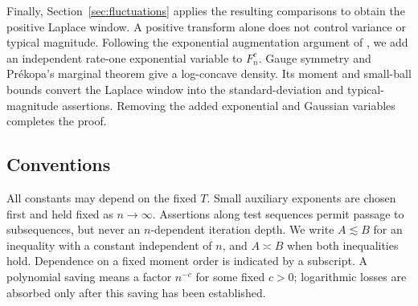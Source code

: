 Finally, Section~\ref{sec:fluctuations} applies the resulting comparisons
to obtain the positive Laplace window. A positive transform alone does
not control variance or typical magnitude. Following the exponential
augmentation argument of \cite[Proposition~5.1]{AL2026}, we add an
independent rate-one exponential variable to $F_n^c$. Gauge symmetry
and Pr\'ekopa's marginal theorem \cite{Prekopa1973} give a log-concave
density. Its moment and small-ball bounds convert the Laplace window
into the standard-deviation and typical-magnitude assertions. Removing
the added exponential and Gaussian variables completes the proof.

\subsection{Conventions}
All constants may depend on the fixed $T$. Small auxiliary exponents are chosen first and held fixed as $n\to\infty$. Assertions along test sequences permit passage to subsequences, but never an $n$-dependent iteration depth. We write $A\lesssim B$ for an inequality with a constant independent of $n$, and $A\asymp B$ when both inequalities hold. Dependence on a fixed moment order is indicated by a subscript. A polynomial saving means a factor $n^{-c}$ for some fixed $c>0$; logarithmic losses are absorbed only after this saving has been established.
